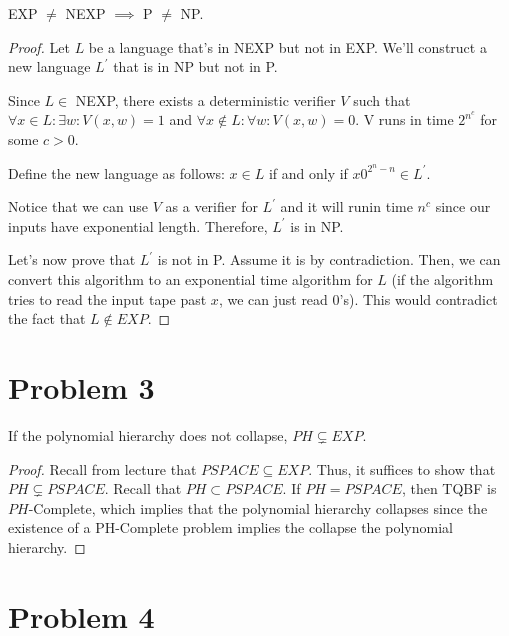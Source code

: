 \documentclass[usletter]{article}
\begin{document}
\begin{lemma}
    EXP $\neq$ NEXP $\implies$ P $\neq$ NP.
\end{lemma}
\begin{proof}
    Let $L$ be a language that's in NEXP but not in EXP. We'll construct a new language
    $L^{\prime}$ that is in NP but not in P.

    Since $L \in$ NEXP, there exists a deterministic verifier $V$ such that
    $\forall x \in L: \exists w: V(x,w) = 1$ and $\forall x \notin L: \forall w: V(x,w) = 0$.
    V runs in time $2^{n^{c}}$ for some $c > 0$. 

    Define the new language as follows: $x \in L$ if and only if $x0^{2^{n} - n} \in L^{\prime}$.

    Notice that we can use $V$ as a verifier for $L^{\prime}$ and it will runin time $n^{c}$
    since our inputs have exponential length. Therefore, $L^{\prime}$ is in NP.

    Let's now prove that $L^{\prime}$ is not in P. Assume it is by contradiction. Then, we can convert
    this algorithm to an exponential time algorithm for $L$ (if the algorithm tries to read the input tape past $x$,
    we can just read 0's). This would contradict the fact that $L \notin EXP$.
\end{proof}

\newpage

\section*{Problem 3}

\begin{lemma}
    If the polynomial hierarchy does not collapse, $PH \subsetneq EXP$.
\end{lemma}
\begin{proof}
    Recall from lecture that $PSPACE \subseteq EXP$. Thus, it suffices
    to show that $PH \subsetneq PSPACE$. Recall that 
    $PH \subset PSPACE$. If $PH = PSPACE$, then TQBF is $PH$-Complete, which
    implies that the polynomial hierarchy collapses since the existence of
    a PH-Complete problem implies the collapse the polynomial hierarchy.
\end{proof}

\newpage

\section*{Problem 4}
\end{document}
